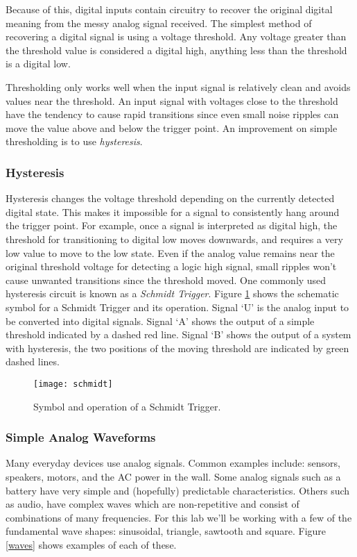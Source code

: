 \documentclass[openany,11pt,fleqn]{book} %
\begin{document}
Because of this, digital inputs contain circuitry to recover the original digital meaning from the messy analog signal received. The simplest method of recovering a digital signal is using a voltage threshold. Any voltage greater than the threshold value is considered a digital high, anything less than the threshold is a digital low. 

Thresholding only works well when the input signal is relatively clean and avoids values near the threshold. An input signal with voltages close to the threshold have the tendency to cause rapid transitions since even small noise ripples can move the value above and below the trigger point. An improvement on simple thresholding is to use \textit{hysteresis}. 

\subsubsection{Hysteresis}

Hysteresis changes the voltage threshold depending on the currently detected digital state. This makes it impossible for a signal to consistently hang around the trigger point. For example, once a signal is interpreted as digital high, the threshold for transitioning to digital low moves downwards, and requires a very low value to move to the low state. Even if the analog value remains near the original threshold voltage for detecting a logic high signal, small ripples won't cause unwanted transitions since the threshold moved. One commonly used hysteresis circuit is known as a \textit{Schmidt Trigger}. Figure \ref{schmidt} shows the schematic symbol for a Schmidt Trigger and its operation. Signal `U' is the analog input to be converted into digital signals. Signal `A' shows the output of a simple threshold indicated by a dashed red line. Signal `B' shows the output of a system with hysteresis, the two positions of the moving threshold are indicated by green dashed lines. 

\begin{figure}[]
    \centering\texttt{[image: schmidt]}
    \caption{Symbol and operation of a Schmidt Trigger.}
    \label{schmidt}
\end{figure}

\subsubsection{Simple Analog Waveforms}
Many everyday devices use analog signals. Common examples include: sensors, speakers, motors, and the AC power in the wall. Some analog signals such as a battery have very simple and (hopefully) predictable characteristics. Others such as audio, have complex waves which are non-repetitive and consist of combinations of many frequencies. For this lab we'll be working with a few of the fundamental wave shapes: sinusoidal, triangle, sawtooth and square. Figure \ref{waves} shows examples of each of these. 
\end{document}
